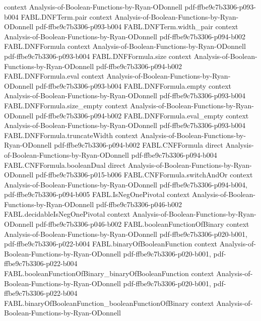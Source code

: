 \begin{theorem}
  {context}
  {Analysis-of-Boolean-Functions-by-Ryan-ODonnell}
  {pdf-ffbe9c7b3306-p093-b004}
\proofstep
  {FABL.DNFTerm.pair}
  {context}
  {Analysis-of-Boolean-Functions-by-Ryan-ODonnell}
  {pdf-ffbe9c7b3306-p093-b004}
\proofstep
  {FABL.DNFTerm.width_pair}
  {context}
  {Analysis-of-Boolean-Functions-by-Ryan-ODonnell}
  {pdf-ffbe9c7b3306-p094-b002}
\proofstep
  {FABL.DNFFormula}
  {context}
  {Analysis-of-Boolean-Functions-by-Ryan-ODonnell}
  {pdf-ffbe9c7b3306-p093-b004}
\proofstep
  {FABL.DNFFormula.size}
  {context}
  {Analysis-of-Boolean-Functions-by-Ryan-ODonnell}
  {pdf-ffbe9c7b3306-p094-b002}
\proofstep
  {FABL.DNFFormula.eval}
  {context}
  {Analysis-of-Boolean-Functions-by-Ryan-ODonnell}
  {pdf-ffbe9c7b3306-p093-b004}
\proofstep
  {FABL.DNFFormula.empty}
  {context}
  {Analysis-of-Boolean-Functions-by-Ryan-ODonnell}
  {pdf-ffbe9c7b3306-p093-b004}
\proofstep
  {FABL.DNFFormula.size_empty}
  {context}
  {Analysis-of-Boolean-Functions-by-Ryan-ODonnell}
  {pdf-ffbe9c7b3306-p094-b002}
\proofstep
  {FABL.DNFFormula.eval_empty}
  {context}
  {Analysis-of-Boolean-Functions-by-Ryan-ODonnell}
  {pdf-ffbe9c7b3306-p093-b004}
\proofstep
  {FABL.DNFFormula.truncateWidth}
  {context}
  {Analysis-of-Boolean-Functions-by-Ryan-ODonnell}
  {pdf-ffbe9c7b3306-p094-b002}
\proofstep
  {FABL.CNFFormula}
  {direct}
  {Analysis-of-Boolean-Functions-by-Ryan-ODonnell}
  {pdf-ffbe9c7b3306-p094-b004}
\proofstep
  {FABL.CNFFormula.booleanDual}
  {direct}
  {Analysis-of-Boolean-Functions-by-Ryan-ODonnell}
  {pdf-ffbe9c7b3306-p015-b006}
\proofstep
  {FABL.CNFFormula.switchAndOr}
  {context}
  {Analysis-of-Boolean-Functions-by-Ryan-ODonnell}
  {pdf-ffbe9c7b3306-p094-b004,
    pdf-ffbe9c7b3306-p094-b005}
\proofstep
  {FABL.IsNegOnePivotal}
  {context}
  {Analysis-of-Boolean-Functions-by-Ryan-ODonnell}
  {pdf-ffbe9c7b3306-p046-b002}
\proofstep
  {FABL.decidableIsNegOnePivotal}
  {context}
  {Analysis-of-Boolean-Functions-by-Ryan-ODonnell}
  {pdf-ffbe9c7b3306-p046-b002}
\proofstep
  {FABL.booleanFunctionOfBinary}
  {context}
  {Analysis-of-Boolean-Functions-by-Ryan-ODonnell}
  {pdf-ffbe9c7b3306-p020-b001,
    pdf-ffbe9c7b3306-p022-b004}
\proofstep
  {FABL.binaryOfBooleanFunction}
  {context}
  {Analysis-of-Boolean-Functions-by-Ryan-ODonnell}
  {pdf-ffbe9c7b3306-p020-b001,
    pdf-ffbe9c7b3306-p022-b004}
\proofstep
  {FABL.booleanFunctionOfBinary_binaryOfBooleanFunction}
  {context}
  {Analysis-of-Boolean-Functions-by-Ryan-ODonnell}
  {pdf-ffbe9c7b3306-p020-b001,
    pdf-ffbe9c7b3306-p022-b004}
\proofstep
  {FABL.binaryOfBooleanFunction_booleanFunctionOfBinary}
  {context}
  {Analysis-of-Boolean-Functions-by-Ryan-ODonnell}

\end{theorem}
